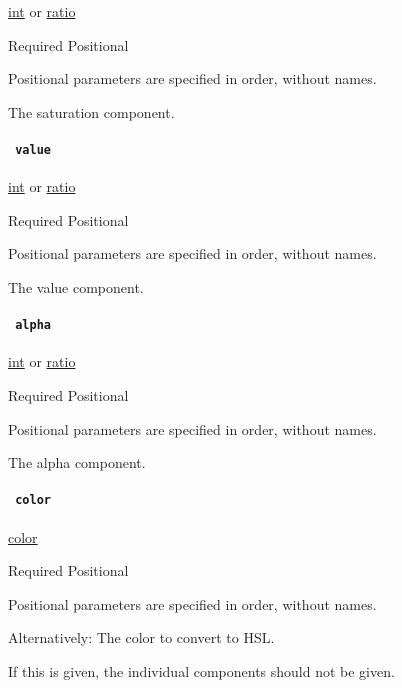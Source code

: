 \href{/docs/reference/foundations/int/}{int} {or}
\href{/docs/reference/layout/ratio/}{ratio}

{Required} {{ Positional }}

\label{definitions-hsv-saturation-positional-tooltip}
Positional parameters are specified in order, without names.

The saturation component.

\paragraph{\texorpdfstring{\texttt{\ value\ }}{ value }}\label{definitions-hsv-value}

\href{/docs/reference/foundations/int/}{int} {or}
\href{/docs/reference/layout/ratio/}{ratio}

{Required} {{ Positional }}

\label{definitions-hsv-value-positional-tooltip}
Positional parameters are specified in order, without names.

The value component.

\paragraph{\texorpdfstring{\texttt{\ alpha\ }}{ alpha }}\label{definitions-hsv-alpha}

\href{/docs/reference/foundations/int/}{int} {or}
\href{/docs/reference/layout/ratio/}{ratio}

{Required} {{ Positional }}

\label{definitions-hsv-alpha-positional-tooltip}
Positional parameters are specified in order, without names.

The alpha component.

\paragraph{\texorpdfstring{\texttt{\ color\ }}{ color }}\label{definitions-hsv-color}

\href{/docs/reference/visualize/color/}{color}

{Required} {{ Positional }}

\label{definitions-hsv-color-positional-tooltip}
Positional parameters are specified in order, without names.

Alternatively: The color to convert to HSL.

If this is given, the individual components should not be given.

